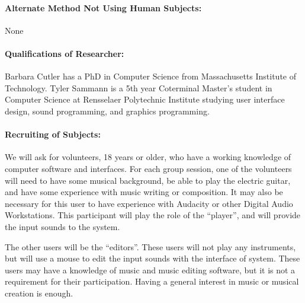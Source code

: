\documentclass[10pt]{article}
\begin{document}
\paragraph{Alternate Method Not Using Human Subjects:}
None

\paragraph{Qualifications of Researcher:}
Barbara Cutler has a PhD in Computer Science from Massachusetts
Institute of Technology.  Tyler Sammann is a 5th year Coterminal Master's student in
Computer Science at Rensselaer Polytechnic Institute studying user interface design, 
sound programming, and graphics programming.

\paragraph{Recruiting of Subjects:}
We will ask for volunteers, 18 years or older, who have a working 
knowledge of computer software and interfaces. For each group session, 
one of the volunteers will need to have some musical background, 
be able to play the electric guitar, and have some experience with 
music writing or composition. It may also be necessary for this user to have
experience with Audacity or other Digital Audio Workstations.
This participant will play the role of the
``player'', and will provide the input sounds to the system.

The other users will be the ``editors''. These users will not play any 
instruments, but will use a mouse to edit the input 
sounds with the interface of system. These users may have a knowledge 
of music and music editing software, but it is not a requirement for
their participation. Having a general interest in music or musical
creation is enough.
% 
\end{document}
